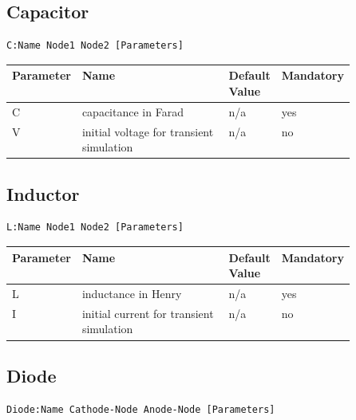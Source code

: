 \subsection{Capacitor}

\begin{verbatim}
C:Name Node1 Node2 [Parameters]
\end{verbatim}


\begin{tabular}{|l|p{0.5\linewidth}|l|l|}
\hline
Parameter & Name & Default Value & Mandatory \\
\hline
C & capacitance in Farad & n/a & yes \\
V & initial voltage for transient simulation & n/a & no \\
\hline
\end{tabular}


\subsection{Inductor}

\begin{verbatim}
L:Name Node1 Node2 [Parameters]
\end{verbatim}


\begin{tabular}{|l|p{0.5\linewidth}|l|l|}
\hline
Parameter & Name & Default Value & Mandatory \\
\hline
L & inductance in Henry & n/a & yes \\
I & initial current for transient simulation & n/a & no \\
\hline
\end{tabular}



\subsection{Diode}

\begin{verbatim}
Diode:Name Cathode-Node Anode-Node [Parameters]
\end{verbatim}


